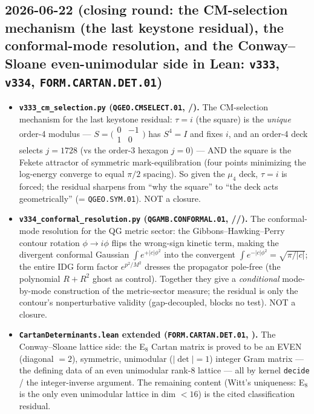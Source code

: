 \subsection*{2026-06-22 (closing round: the CM-selection mechanism (the last keystone residual), the conformal-mode resolution, and the Conway--Sloane even-unimodular side in Lean: \texttt{v333}, \texttt{v334}, \texttt{FORM.CARTAN.DET.01})}
\begin{itemize}
\item \textbf{\texttt{v333\_cm\_selection.py} (\texttt{QGEO.CMSELECT.01}, \mE/\mO).} The CM-selection mechanism for
  the last keystone residual: $\tau{=}i$ (the square) is the \emph{unique} order-4 modulus --- $S{=}\bigl(\begin{smallmatrix}0&-1\\1&0\end{smallmatrix}\bigr)$ has $S^4{=}I$ and fixes $i$, and an order-4 deck selects
  $j{=}1728$ (vs the order-3 hexagon $j{=}0$) --- AND the square is the Fekete attractor of symmetric
  mark-equilibration (four points minimizing the log-energy converge to equal $\pi/2$ spacing).  So given the
  $\mu_4$ deck, $\tau{=}i$ is forced; the residual sharpens from ``why the square'' to ``the deck acts
  geometrically'' (= \texttt{QGEO.SYM.01}).  NOT a closure.
\item \textbf{\texttt{v334\_conformal\_resolution.py} (\texttt{QGAMB.CONFORMAL.01}, \mE/\mC/\mO).} The
  conformal-mode resolution for the QG metric sector: the Gibbons--Hawking--Perry contour rotation $\phi\to i\phi$
  flips the wrong-sign kinetic term, making the divergent conformal Gaussian $\int e^{+|c|\phi^2}$ into the
  convergent $\int e^{-|c|\phi^2}{=}\sqrt{\pi/|c|}$; the entire IDG form factor $e^{p^2/M^2}$ dresses the
  propagator pole-free (the polynomial $R{+}R^2$ ghost as control).  Together they give a \emph{conditional}
  mode-by-mode construction of the metric-sector measure; the residual is only the contour's nonperturbative
  validity (gap-decoupled, blocks no test).  NOT a closure.
\item \textbf{\texttt{CartanDeterminants.lean} extended (\texttt{FORM.CARTAN.DET.01}, \mE).} The Conway--Sloane
  lattice side: the E$_8$ Cartan matrix is proved to be an EVEN (diagonal $=2$), symmetric, unimodular
  ($|\det|{=}1$) integer Gram matrix --- the defining data of an even unimodular rank-8 lattice --- all by kernel
  \texttt{decide} / the integer-inverse argument.  The remaining content (Witt's uniqueness: E$_8$ is the only even
  unimodular lattice in dim $<16$) is the cited classification residual.
\end{itemize}


